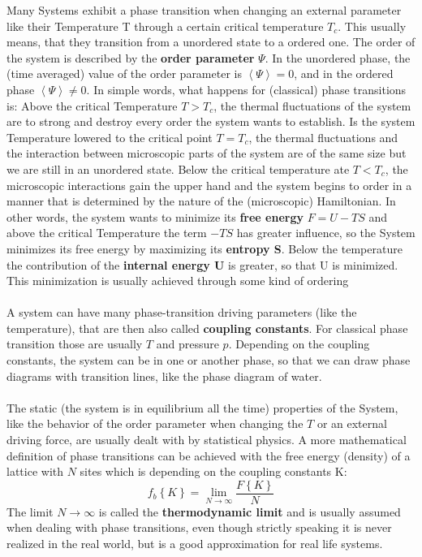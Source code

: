 		Many Systems exhibit a phase transition when changing an external parameter like their Temperature T through a certain critical temperature $T_c$. This usually means, that they transition from a unordered state to a ordered one. The order of the system is described by the \textbf{order parameter} $\Psi$. In the unordered phase, the (time averaged) value of the order parameter is $\left\langle \Psi \right\rangle = 0$, and in the ordered phase $\left\langle \Psi \right\rangle \neq 0$. In simple words, what happens for (classical) phase transitions is: Above the critical Temperature $T > T_c$, the thermal fluctuations of the system are to strong and destroy every order the system wants to establish. Is the system Temperature lowered to the critical point $T = T_c$, the thermal fluctuations and the interaction between microscopic parts of the system are of the same size but we are still in an unordered state. Below the critical temperature ate $T < T_c$, the microscopic interactions gain the upper hand and the system begins to order in a manner that is determined by the nature of the (microscopic) Hamiltonian. In other words, the system wants to minimize its \textbf{free energy} $F =	U - TS$ and above the critical Temperature the term $-TS$ has greater influence, so the System minimizes its free energy by maximizing its \textbf{entropy S}. Below the temperature the contribution of the \textbf{internal energy U} is greater, so that U is minimized. This minimization is usually achieved through some kind of ordering
		\\
	 	\\
		A system can have many phase-transition driving parameters (like the temperature), that are then also called \textbf{coupling constants}. For classical phase transition those are usually $T$ and pressure $p$. Depending on the coupling constants, the system can be in one or another phase, so that we can draw phase diagrams with transition lines, like the phase diagram of water.
		\\
		\\
		The static (the system is in equilibrium all the time) properties of the System, like the behavior of the order parameter when changing the $T$ or an external driving force, are usually dealt with by statistical physics. A more mathematical definition of phase transitions can be achieved with the free energy (density) of a lattice with $N$ sites which is depending on the coupling constants K:
		\begin{equation}
			f_b\left\lbrace K \right\rbrace = \lim_{N \rightarrow \infty} \frac{F\left\lbrace K \right\rbrace}{N}	
		\end{equation}
		The limit $N \rightarrow \infty$ is called the \textbf{thermodynamic limit} and is usually assumed when dealing with phase transitions, even though strictly speaking it is never realized in the real world, but is a good approximation for real life systems.
		

